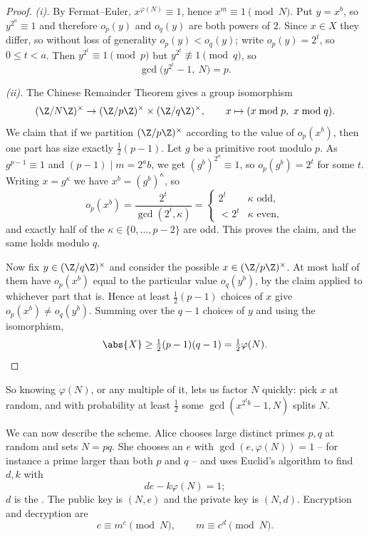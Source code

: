 \begin{proof}
	\emph{(i).} By Fermat--Euler, $x^{\varphi(N)}\equiv1$, hence $x^m\equiv1\pmod N$. Put $y = x^b$, so $y^{2^a}\equiv1$ and therefore $o_p(y)$ and $o_q(y)$ are both powers of $2$. Since $x \in X$ they differ, so without loss of generality $o_p(y)<o_q(y)$; write $o_p(y)=2^t$, so $0 \le t<a$. Then $y^{2^t}\equiv1\pmod p$ but $y^{2^t}\not\equiv1\pmod q$, so
	$$\gcd\bigl(y^{2^t}-1,\ N\bigr) = p.$$

	\emph{(ii).} The Chinese Remainder Theorem gives a group isomorphism
	$$(\Z/N\Z)^\times \to (\Z/p\Z)^\times\times(\Z/q\Z)^\times, \qquad x \mapsto (x \bmod p,\ x\bmod q).$$
	We claim that if we partition $(\Z/p\Z)^\times$ according to the value of $o_p(x^b)$, then one part has size exactly $\tfrac12(p-1)$. Let $g$ be a primitive root modulo $p$. As $g^{p-1}\equiv1$ and $(p-1)\mid m = 2^ab$, we get $(g^b)^{2^a}\equiv1$, so $o_p(g^b) = 2^t$ for some $t$. Writing $x = g^\kappa$ we have $x^b = (g^b)^\kappa$, so
	$$o_p(x^b) = \frac{2^t}{\gcd(2^t,\kappa)} = \begin{cases} 2^t & \kappa \text{ odd},\\ <2^t & \kappa \text{ even},\end{cases}$$
	and exactly half of the $\kappa \in\{0,\dots,p-2\}$ are odd. This proves the claim, and the same holds modulo $q$.

	Now fix $y \in (\Z/q\Z)^\times$ and consider the possible $x \in (\Z/p\Z)^\times$. At most half of them have $o_p(x^b)$ equal to the particular value $o_q(y^b)$, by the claim applied to whichever part that is. Hence at least $\tfrac12(p-1)$ choices of $x$ give $o_p(x^b)\ne o_q(y^b)$. Summing over the $q-1$ choices of $y$ and using the isomorphism,
	$$\abs{X}\ge\tfrac12(p-1)(q-1) = \tfrac12\varphi(N). \qedhere$$
\end{proof}

So knowing $\varphi(N)$, or any multiple of it, lets us factor $N$ quickly: pick $x$ at random, and with probability at least $\tfrac12$ some $\gcd(x^{2^tb}-1,N)$ splits $N$.

We can now describe the scheme. Alice chooses large distinct primes $p,q$ at random and sets $N = pq$. She chooses an  $e$ with $\gcd(e,\varphi(N))=1$ -- for instance a prime larger than both $p$ and $q$ -- and uses Euclid's algorithm to find $d,k$ with
$$de - k\varphi(N) = 1;$$
$d$ is the . The public key is $(N,e)$ and the private key is $(N,d)$. Encryption and decryption are
$$c \equiv m^e \pmod N, \qquad m \equiv c^d\pmod N.$$

